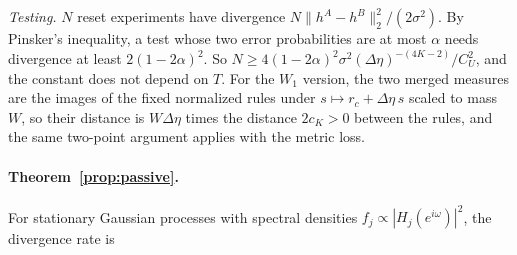 \documentclass[12pt]{article}
\theoremstyle{definition}
\theoremstyle{remark}
\begin{document}
\emph{Testing.} $N$ reset experiments have divergence $N\|h^A-h^B\|_2^2/(2\sigma^2)$. By Pinsker's inequality, a test whose two error probabilities are at most $\alpha$ needs divergence at least $2(1-2\alpha)^2$. So $N\ge4(1-2\alpha)^2\sigma^2(\Delta\eta)^{-(4K-2)}/C_U^2$, and the constant does not depend on $T$. For the $W_1$ version, the two merged measures are the images of the fixed normalized rules under $s\mapsto r_c+\Delta\eta\,s$ scaled to mass $W$, so their distance is $W\Delta\eta$ times the distance $2c_K>0$ between the rules, and the same two-point argument applies with the metric loss.


\paragraph{Theorem~\ref{prop:passive}.} For stationary Gaussian processes with spectral densities $f_j\propto|H_j(e^{i\omega})|^2$, the divergence rate is
\end{document}
